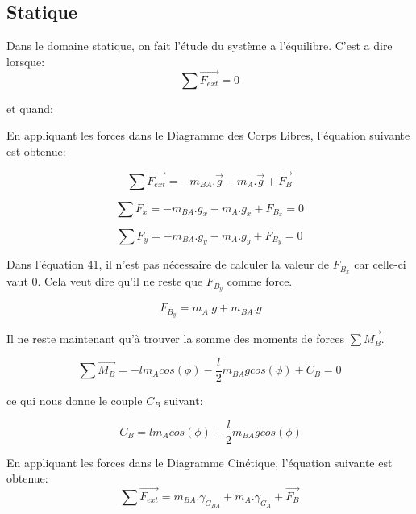 \documentclass{article}
\begin{document}
\subsection{Statique}
\noindent
Dans le domaine statique, on fait l'étude du système a l'équilibre. C'est a dire lorsque: 
\begin{equation}
\sum \overrightarrow{F_{ext}} = 0
\end{equation}

\begin{center} 
et quand:
\end{center}

\noindent En appliquant les forces dans le Diagramme des Corps Libres, l'équation suivante est obtenue:

\begin{equation}
\sum \overrightarrow{F_{ext}} = -m_{BA}.\overrightarrow{g} -m_A.\overrightarrow{g} + \overrightarrow{F_B}
\end{equation}

\begin{equation}
\sum F_x = -m_{BA}.g_x -m_A.g_x + F_{B_x} = 0
\end{equation}

\begin{equation}
\sum F_y = -m_{BA}.g_y -m_A.g_y + F_{B_y} = 0
\end{equation}

\noindent Dans l'équation 41, il n'est pas nécessaire de calculer la valeur de $F_{B_x}$ car celle-ci vaut 0. Cela veut dire qu'il ne reste que $F_{B_y}$ comme force.

\begin{equation}
\ F_{B_y} = m_A.g + m_{BA}.g
\end{equation}

\noindent Il ne reste maintenant qu'à trouver la somme des moments de forces $\sum \overrightarrow{M_B}$.

\begin{equation}
\sum \overrightarrow{M_B} = -lm_Acos(\phi) - \frac{l}{2}m_{BA}gcos(\phi) + C_B = 0
\end{equation}

\noindent ce qui nous donne le couple $C_B$ suivant: 

\begin{equation}
\ C_B = lm_Acos(\phi)+ \frac{l}{2}m_{BA}gcos(\phi)
\end{equation}

\noindent En appliquant les forces dans le Diagramme Cinétique, l'équation suivante est obtenue:
\begin{equation}
\sum \overrightarrow{F_{ext}} = m_{BA}.\gamma_{G_{BA}} + m_A.\gamma_{G_A} + \overrightarrow{F_B}
\end{equation}
\end{document}
